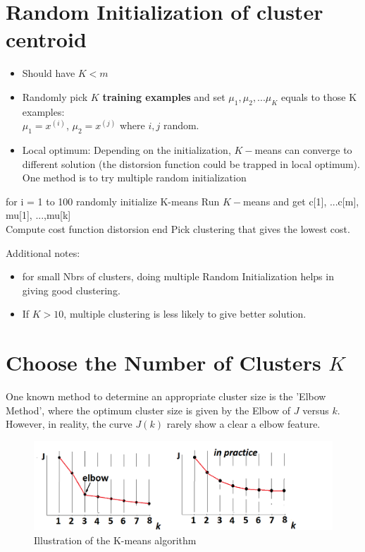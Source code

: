 \documentclass[a4paper,12pt]{report}
\begin{document}
\section{Random Initialization of cluster centroid}
\begin{itemize}
\item Should have $K < m$
\item Randomly pick $K$ \textbf{training examples} and set $\mu_1, \mu_2, ...\mu_K$ equals to those K examples: \\
$\mu_1 = x^{(i)}$, $\mu_2 = x^{(j)}$ where $i, j$ random. \\
\item Local optimum: Depending on the initialization, $K-$means can converge to different solution (the distorsion function could be trapped in local optimum). One method is to try multiple random initialization\\
\end{itemize}

\begin{tcolorbox}
\begin{python}
for i = 1 to 100 
	randomly initialize K-means
	Run $K-$means and get c[1], ...c[m], mu[1], ...,mu[k] \\
	Compute cost  function distorsion
end
Pick clustering that gives the lowest cost.
\end{python}
\end{tcolorbox}
Additional notes:

\begin{itemize}
\item for small Nbrs of clusters, doing multiple Random Initialization helps in giving good clustering.
\item If $K>10$, multiple clustering is less likely to give better solution.
\end{itemize}
\section{Choose the Number of Clusters $K$}
One known method to determine an appropriate cluster size is the 'Elbow Method', where the optimum cluster size is given by the Elbow of $J$ versus $k$.
However, in reality, the curve $J(k)$ rarely show a clear a elbow feature.
\begin{figure}[H]
	\centering
        \includegraphics[totalheight=5 cm]{fig4.png}\caption{Illustration of the K-means algorithm}
\end{figure}
\end{document}
